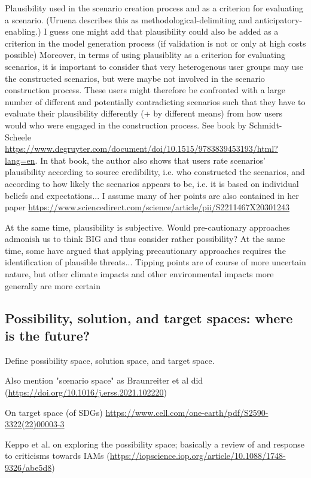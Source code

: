 \documentclass{article}
\begin{document}
\begin{refsection}
Plausibility used in the scenario creation process and as a criterion for evaluating a scenario. (Uruena describes this as methodological-delimiting and anticipatory-enabling.) I guess one might add that plausibility could also be added as a criterion in the model generation process (if validation is not or only at high costs possible)
Moreover, in terms of using plausiblity as a criterion for evaluating scenarios, it is important to consider that very heterogenous user groups may use the constructed scenarios, but were maybe not involved in the scenario construction process. These users might therefore be confronted with a large number of different and potentially contradicting scenarios such that they have to evaluate their plausibility differently (+ by different means) from how users would who were engaged in the construction process. See book by Schmidt-Scheele \url{https://www.degruyter.com/document/doi/10.1515/9783839453193/html?lang=en}. In that book, the author also shows that users rate scenarios' plausibility according to source credibility, i.e. who constructed the scenarios, and according to how likely the scenarios appears to be, i.e. it is based on individual beliefs and expectations... I assume many of her points are also contained in her paper \url{https://www.sciencedirect.com/science/article/pii/S2211467X20301243}

At the same time, plausibility is subjective. Would pre-cautionary approaches admonish us to think BIG and thus consider rather possibility?
At the same time, some have argued that applying precautionary approaches requires the identification of plausible threats...
Tipping points are of course of more uncertain nature, but other climate impacts and other environmental impacts more generally are more certain



\subsection{Possibility, solution, and target spaces: where is the future?}

Define possibility space, solution space, and target space.

Also mention "scenario space" as Braunreiter et al did (\url{https://doi.org/10.1016/j.erss.2021.102220})

On target space (of SDGs) \url{https://www.cell.com/one-earth/pdf/S2590-3322(22)00003-3}

Keppo et al. on exploring the possibility space; basically a review of and response to criticisms towards IAMs (\url{https://iopscience.iop.org/article/10.1088/1748-9326/abe5d8})


\end{refsection}
\end{document}
